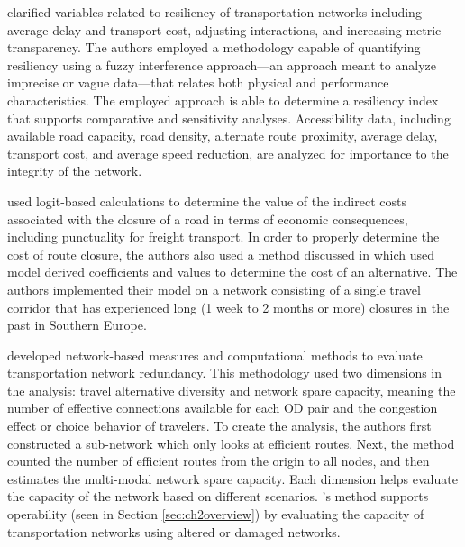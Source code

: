 \citet{serulle2011} clarified variables related to resiliency
of transportation networks including average delay and transport cost,
adjusting interactions,
and increasing metric transparency. The authors employed a methodology
capable of quantifying
resiliency using a fuzzy interference approach---an approach meant to analyze
imprecise or vague data---that relates both physical and performance characteristics. The employed approach
is able to determine a
resiliency index that supports comparative and sensitivity analyses.
Accessibility data, including
available road capacity, road density, alternate route proximity, average
delay, transport cost,
and average speed reduction, are analyzed for importance to the integrity
of the network.

\citet{Masiero2012} used logit-based calculations to determine the value of the
indirect costs associated with the closure of a road in terms of economic consequences, including
punctuality for freight transport. In order to properly determine the
cost of route closure, the authors also used a method discussed in
\citet{koppelman2006} which used model derived coefficients and values to
determine the cost of an alternative. The authors implemented their
model on a network consisting of a single travel corridor that has
experienced long (1 week to 2 months or more) closures in the past in Southern Europe.

\citet{xiangdong2015} developed network-based measures and computational
methods to evaluate transportation network redundancy. This methodology used
two dimensions in the analysis: travel alternative diversity and network spare
capacity, meaning the number of effective connections available for each OD
pair and the congestion effect or choice behavior of travelers. To create the
analysis, the authors first constructed a sub-network which only looks at
efficient routes. Next, the method counted the number of efficient routes
from the origin to all nodes, and then estimates the multi-modal network
spare capacity. Each dimension helps evaluate the capacity of the network
based on different scenarios. \citeauthor{xiangdong2015}'s method supports operability
(seen in Section \ref{sec:ch2overview}) by evaluating the capacity of
transportation networks using altered or damaged networks.

